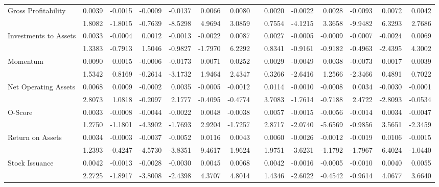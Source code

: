 \begin{sidewaystable}[htbp]
{\begin{tabular}{lrrrrrrrrrrrrr}
Gross Profitability & 0.0039 & -0.0015 & -0.0009 & -0.0137 & 0.0066 & 0.0080 &       & 0.0020 & -0.0022 & 0.0028 & -0.0093 & 0.0072 & 0.0042 \\
& 1.8082 & -1.8015 & -0.7639 & -8.5298 & 4.9694 & 3.0859 &       & 0.7554 & -4.1215 & 3.3658 & -9.9482 & 6.3293 & 2.7686 \\
Investments to Assets & 0.0033 & -0.0004 & 0.0012 & -0.0013 & -0.0022 & 0.0087 &       & 0.0027 & -0.0005 & -0.0009 & -0.0007 & -0.0024 & 0.0069 \\
& 1.3383 & -0.7913 & 1.5046 & -0.9827 & -1.7970 & 6.2292 &       & 0.8341 & -0.9161 & -0.9182 & -0.4963 & -2.4395 & 4.3002 \\
Momentum & 0.0090 & 0.0015 & -0.0006 & -0.0173 & 0.0071 & 0.0252 &       & 0.0029 & -0.0049 & 0.0038 & -0.0073 & 0.0017 & 0.0039 \\
& 1.5342 & 0.8169 & -0.2614 & -3.1732 & 1.9464 & 2.4347 &       & 0.3266 & -2.6416 & 1.2566 & -2.3466 & 0.4891 & 0.7022 \\
Net Operating Assets & 0.0068 & 0.0009 & -0.0002 & 0.0035 & -0.0005 & -0.0012 &       & 0.0114 & -0.0010 & -0.0008 & 0.0034 & -0.0030 & -0.0001 \\
& 2.8073 & 1.0818 & -0.2097 & 2.1777 & -0.4095 & -0.4774 &       & 3.7083 & -1.7614 & -0.7188 & 2.4722 & -2.8093 & -0.0534 \\
O-Score & 0.0033 & -0.0008 & -0.0044 & -0.0022 & 0.0048 & -0.0038 &       & 0.0057 & -0.0015 & -0.0056 & -0.0014 & 0.0034 & -0.0047 \\
& 1.2750 & -1.1801 & -4.3902 & -1.7693 & 2.9204 & -1.7257 &       & 2.8717 & -2.0740 & -5.6569 & -0.9856 & 3.5651 & -2.3459 \\
Return on Assets & 0.0034 & -0.0003 & -0.0037 & -0.0052 & 0.0116 & 0.0043 &       & 0.0060 & -0.0026 & -0.0012 & -0.0019 & 0.0106 & -0.0015 \\
& 1.2393 & -0.4247 & -4.5730 & -3.8351 & 9.4617 & 1.9624 &       & 1.9751 & -3.6231 & -1.1792 & -1.7967 & 6.4024 & -1.0440 \\
Stock Issuance & 0.0042 & -0.0013 & -0.0028 & -0.0030 & 0.0045 & 0.0068 &       & 0.0042 & -0.0016 & -0.0005 & -0.0010 & 0.0040 & 0.0055 \\
& 2.2725 & -1.8917 & -3.8008 & -2.4398 & 4.3707 & 4.8014 &       & 1.4346 & -2.6022 & -0.4542 & -0.9614 & 4.0677 & 3.6640 \\
\bottomrule
\end{tabular}%
}
\label{tab:liq-ff5}%
\end{sidewaystable}%

